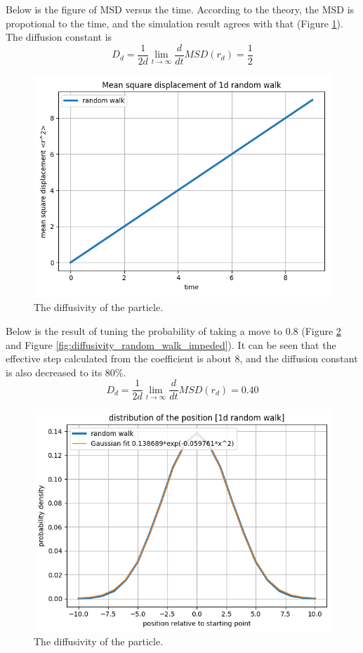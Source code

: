 \documentclass{assignmeownt}
\begin{document}
Below is the figure of MSD versus the time. According to the theory, the MSD is propotional to the time, and the simulation result agrees with that (Figure \ref{fig:diffusivity_random_walk}). The diffusion constant is
$$
D_d = \frac{1}{2d}\lim_{t\rightarrow \infty}\frac{d}{dt}MSD(r_d)=\frac{1}{2}
$$

\begin{figure}
  \centering
  \includegraphics[width=0.5\linewidth]{../block1/4-RandomWalk1D/Results/Figure_2.png}
  \caption{The diffusivity of the particle.}
  \label{fig:diffusivity_random_walk}
\end{figure}
Below is the result of tuning the probability of taking a move to 0.8 (Figure \ref{fig:gaussian_comparison_impeded} and Figure \ref{fig:diffusivity_random_walk_impeded}). It can be seen that the effective step calculated from the coefficient is about 8, and the diffusion constant is also decreased to its 80\%.
$$
D_d = \frac{1}{2d}\lim_{t\rightarrow \infty}\frac{d}{dt}MSD(r_d)=0.40
$$
\begin{figure}
  \centering
  \includegraphics[width=0.5\linewidth]{../block1/4-RandomWalk1D/Results/Figure_3.png}
  \caption{The diffusivity of the particle.}
  \label{fig:gaussian_comparison_impeded}
\end{figure}
\end{document}

